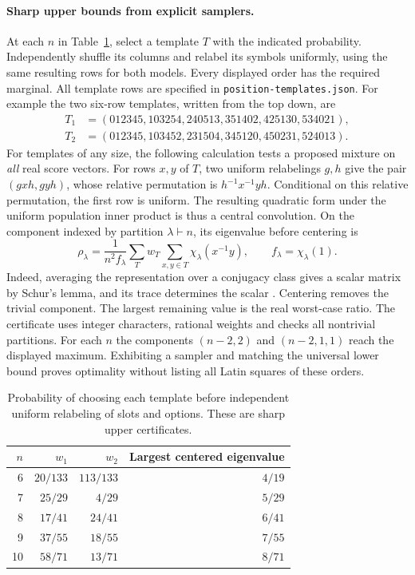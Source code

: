 \paragraph{Sharp upper bounds from explicit samplers.}
At each $n$ in Table~\ref{tab:template-weights}, select a template $T$
with the indicated probability. Independently shuffle its columns and
relabel its symbols uniformly, using the same resulting rows for both
models. Every displayed order has the required marginal. All template
rows are specified in \texttt{position-templates.json}. For example
the two six-row templates, written from the top down, are
\[
\begin{split}
T_1&=(012345,103254,240513,351402,425130,534021),\\
T_2&=(012345,103452,231504,345120,450231,524013).
\end{split}
\]
For templates of any size, the following calculation tests a proposed
mixture on \emph{all} real score vectors. For rows $x,y$ of $T$, two
uniform relabelings $g,h$ give the pair $(gxh,gyh)$, whose relative
permutation is $h^{-1}x^{-1}yh$. Conditional on this relative
permutation, the first row is uniform. The resulting quadratic form
under the uniform population inner product is thus a central
convolution. On the component indexed by partition $\lambda\vdash n$,
its eigenvalue before centering is
\begin{equation}
 \rho_\lambda=\frac{1}{n^2 f_\lambda}
 \sum_T w_T\sum_{x,y\in T}\chi_\lambda(x^{-1}y),
 \qquad f_\lambda=\chi_\lambda(1).
 \label{eq:character-certificate}
\end{equation}
Indeed, averaging the representation over a conjugacy class gives a
scalar matrix by Schur's lemma, and its trace determines the scalar
\citep{diaconis1981}. Centering removes the trivial component. The
largest remaining value is the real worst-case ratio. The certificate
uses integer characters, rational weights and checks all nontrivial
partitions. For each $n$ the components $(n-2,2)$ and $(n-2,1,1)$
reach the displayed maximum. Exhibiting a sampler and matching the
universal lower bound proves optimality without listing all Latin
squares of these orders.

\begin{table}[ht]
\centering
\caption{Probability of choosing each template before independent
uniform relabeling of slots and options. These are sharp upper certificates.}
\label{tab:template-weights}
\begin{tabular}{rrrr}
\toprule
$n$ & $w_1$ & $w_2$ & Largest centered eigenvalue \\
\midrule
6 & $20/133$ & $113/133$ & $4/19$ \\
7 & $25/29$ & $4/29$ & $5/29$ \\
8 & $17/41$ & $24/41$ & $6/41$ \\
9 & $37/55$ & $18/55$ & $7/55$ \\
10 & $58/71$ & $13/71$ & $8/71$ \\
\bottomrule
\end{tabular}
\end{table}

